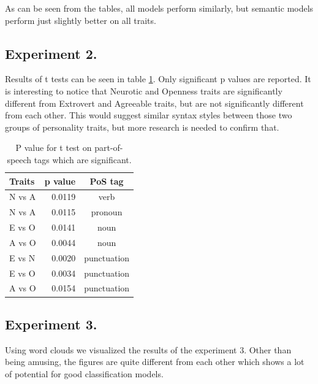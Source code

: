 \documentclass[10pt, a4paper]{article}
\begin{document}
As can be seen from the tables, all models perform similarly, but semantic models perform just slightly better on all traits.

\subsection{Experiment 2.}

Results of t tests can be seen in table \ref{table:ttest}.
Only significant p values are reported.
It is interesting to notice that Neurotic and Openness traits are significantly different from Extrovert and Agreeable traits, but are not significantly different from each other.
This would suggest similar syntax styles between those two groups of personality traits, but more research is needed to confirm that.

\begin{table}[H]
  \centering
  \caption{P value for t test on part-of-speech tags which are significant.}
  \begin{tabular}{lrc}
    \toprule
    Traits & p value & PoS tag \\
    \midrule
    N vs A & 0.0119 & verb \\
    N vs A & 0.0115 & pronoun \\
    E vs O & 0.0141 & noun \\
    A vs O & 0.0044 & noun \\
    E vs N & 0.0020 & punctuation \\
    E vs O & 0.0034 & punctuation \\
    A vs O & 0.0154 & punctuation \\
    \bottomrule
  \end{tabular}
  \label{table:ttest}
\end{table}

\subsection{Experiment 3.}

Using word clouds we visualized the results of the experiment 3.
Other than being amusing, the figures are quite different from each other which shows a lot of potential for good classification models.
\end{document}
